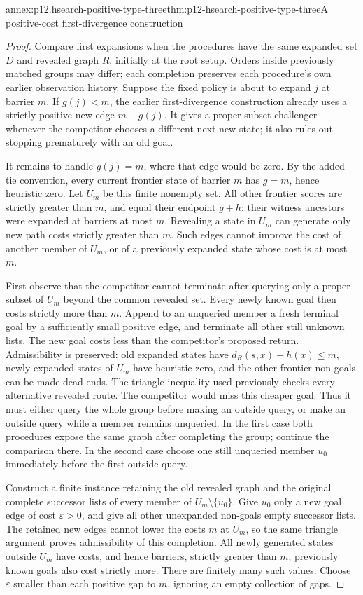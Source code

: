 \begin{annexitem}{annex:p12.hsearch-positive-type-three}{thm:p12-hsearch-positive-type-three}{A positive-cost first-divergence construction}
\begin{proof}
Compare first expansions when the procedures have the same expanded set
\(D\) and revealed graph \(R\), initially at the root setup.
Orders inside previously matched groups may differ; each completion
preserves each procedure's own earlier observation history. Suppose
the fixed policy is about to expand \(j\) at barrier \(m\).
If \(g(j)<m\), the earlier first-divergence construction already
uses a strictly positive new edge \(m-g(j)\). It gives a proper-subset
challenger whenever the competitor chooses a different next new state;
it also rules out stopping prematurely with an old goal.

It remains to handle \(g(j)=m\), where that edge would be zero.
By the added tie convention, every current frontier state of barrier
\(m\) has \(g=m\), hence heuristic zero. Let \(U_m\) be this
finite nonempty set. All other frontier scores are strictly greater
than \(m\), and equal their endpoint \(g+h\): their witness
ancestors were expanded at barriers at most \(m\). Revealing a
state in \(U_m\) can generate only new path costs strictly greater
than \(m\). Such edges cannot improve the cost of another member
of \(U_m\), or of a previously expanded state whose cost is at
most \(m\).

First observe that the competitor cannot terminate after querying only
a proper subset of \(U_m\) beyond the common revealed set.
Every newly known goal then costs strictly more than \(m\). Append
to an unqueried member a fresh terminal goal by a sufficiently small
positive edge, and terminate all other still unknown lists. The new
goal costs less than the competitor's proposed return. Admissibility is
preserved: old expanded states have \(d_R(s,x)+h(x)\le m\),
newly expanded states of \(U_m\) have heuristic zero, and the
other frontier non-goals can be made dead ends. The triangle inequality
used previously checks every alternative revealed route. The competitor
would miss this cheaper goal. Thus it must either query the whole group
before making an outside query, or make an outside query while a member
remains unqueried. In the first case both procedures expose the same
graph after completing the group; continue the comparison there. In
the second case choose one still unqueried member \(u_0\) immediately
before the first outside query.

Construct a finite instance retaining the old revealed graph and the
original complete successor lists of every member of
\(U_m\setminus\{u_0\}\). Give \(u_0\) only a new goal edge
of cost \(\varepsilon>0\), and give all other unexpanded non-goals
empty successor lists. The retained new edges cannot lower the costs
\(m\) at \(U_m\), so the same triangle argument proves
admissibility of this completion. All newly generated states outside
\(U_m\) have costs, and hence barriers, strictly greater than
\(m\); previously known goals also cost strictly more. There are
finitely many such values. Choose \(\varepsilon\) smaller than
each positive gap to \(m\), ignoring an empty collection of gaps.


\end{proof}
\end{annexitem}
